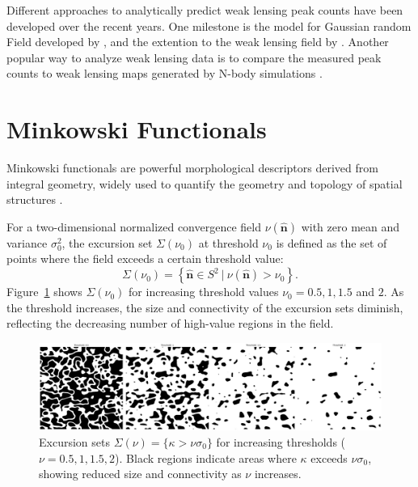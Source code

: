 Different approaches to analytically predict weak lensing peak counts have been developed over the recent years. One milestone is the model for Gaussian random Field developed by \citet{1986ApJ...304...15B}, and the extention to the weak lensing field by \citet{2010A&A...519A..23M}. Another popular way to analyze weak lensing data is to compare the measured peak counts to weak lensing maps generated by N-body simulations \citep{2010PhRvD..81h3505M, 2016MNRAS.463.3653K, 2018MNRAS.474..712M, 2021JCAP...01..028Z}.

\section{Minkowski Functionals}
\label{sec:minkowski_functionals}
Minkowski functionals are powerful morphological descriptors derived from integral geometry, widely used to quantify the geometry and topology of spatial structures \citep{2024arXiv241000401A}. 

For a two-dimensional normalized convergence field $\nu(\hat{\mathbf{n}})$ with zero mean and variance $\sigma_0^2$, the excursion set $\Sigma(\nu_0)$ at threshold $\nu_0$ is defined as the set of points where the field exceeds a certain threshold value:
\begin{equation}
    \Sigma(\nu_0) = \left\{ \hat{\mathbf{n}} \in S^2 \ \bigg| \ \nu(\hat{\mathbf{n}}) > \nu_0 \right\}.
\end{equation}
Figure~\ref{fig:excursion_sets} shows $\Sigma(\nu_0)$ for increasing threshold values $\nu_0 = 0.5, 1, 1.5$ and $2$. As the threshold increases, the size and connectivity of the excursion sets diminish, reflecting the decreasing number of high-value regions in the field.
\begin{figure}[ht]
    \centering
    \includegraphics[width=\textwidth]{figures/threshold_comparison.png}
    \caption[Excursion sets of different thresholds]{Excursion sets $\Sigma(\nu) = \{ \kappa > \nu \sigma_0 \}$ for increasing thresholds ($\nu = 0.5, 1, 1.5, 2$). Black regions indicate areas where $\kappa$ exceeds $\nu \sigma_0$, showing reduced size and connectivity as $\nu$ increases.}
    \label{fig:excursion_sets}
\end{figure}

